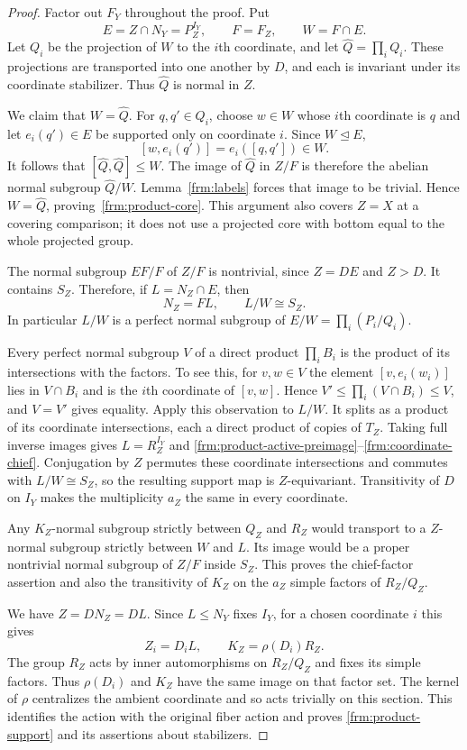 \begin{proof}
Factor out $F_Y$ throughout the proof. Put
\[
 E=Z\cap N_Y=P_Z^{I_Y},\qquad F=F_Z,
 \qquad W=F\cap E.
\]
Let $Q_i$ be the projection of $W$ to the $i$th coordinate, and let
$\widehat Q=\prod_iQ_i$. These projections are transported into one
another by $D$, and each is invariant under its coordinate stabilizer.
Thus $\widehat Q$ is normal in $Z$.

We claim that $W=\widehat Q$. For $q,q'\in Q_i$, choose $w\in W$
whose $i$th coordinate is $q$ and let $e_i(q')\in E$ be supported only
on coordinate $i$. Since $W\trianglelefteq E$,
\[
 [w,e_i(q')]=e_i([q,q'])\in W.
\]
It follows that $[\widehat Q,\widehat Q]\le W$.
The image of $\widehat Q$ in $Z/F$ is therefore the abelian normal
subgroup $\widehat Q/W$. Lemma~\ref{frm:labels} forces that image to
be trivial. Hence $W=\widehat Q$, proving~\eqref{frm:product-core}.
This argument also covers $Z=X$ at a covering comparison; it does not
use a projected core with bottom equal to the whole projected group.

The normal subgroup $EF/F$ of $Z/F$ is nontrivial, since $Z=DE$ and
$Z>D$. It contains $S_Z$. Therefore, if $L=N_Z\cap E$, then
\[
 N_Z=FL,\qquad L/W\cong S_Z.
\]
In particular $L/W$ is a perfect normal subgroup of
$E/W=\prod_i(P_i/Q_i)$.

Every perfect normal subgroup $V$ of a direct product $\prod_iB_i$ is
the product of its intersections with the factors. To see this, for
$v,w\in V$ the element $[v,e_i(w_i)]$ lies in $V\cap B_i$ and is
the $i$th coordinate of $[v,w]$. Hence
$V'\le\prod_i(V\cap B_i)\le V$, and $V=V'$ gives equality.
Apply this observation to $L/W$. It splits as a product of its
coordinate intersections, each a direct product of copies of $T_Z$.
Taking full inverse images gives $L=R_Z^{I_Y}$ and
\eqref{frm:product-active-preimage}--\eqref{frm:coordinate-chief}.
Conjugation by $Z$ permutes these coordinate intersections and commutes
with $L/W\cong S_Z$, so the resulting support map is $Z$-equivariant.
Transitivity of $D$ on $I_Y$ makes the multiplicity $a_Z$ the same in
every coordinate.

Any $K_Z$-normal subgroup strictly between $Q_Z$ and $R_Z$ would
transport to a $Z$-normal subgroup strictly between $W$ and $L$.
Its image would be a proper nontrivial normal subgroup of $Z/F$
inside $S_Z$. This proves the chief-factor assertion and also the
transitivity of $K_Z$ on the $a_Z$ simple factors of $R_Z/Q_Z$.

We have $Z=DN_Z=DL$. Since $L\le N_Y$ fixes $I_Y$, for a chosen
coordinate $i$ this gives
\[
 Z_i=D_iL,\qquad K_Z=\rho(D_i)R_Z.
\]
The group $R_Z$ acts by inner automorphisms on $R_Z/Q_Z$ and fixes
its simple factors. Thus $\rho(D_i)$ and $K_Z$ have the same image
on that factor set. The kernel of $\rho$ centralizes the ambient
coordinate and so acts trivially on this section. This identifies the
action with the original fiber action and proves
\eqref{frm:product-support} and its assertions about stabilizers.


\end{proof}
